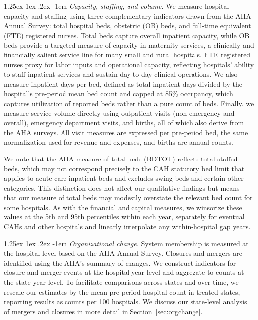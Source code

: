\documentclass[a4paper, 12pt, twoside]{article}
\makeatletter
\renewcommand\paragraph{\@startsection{paragraph}{4}{\z@}%
   {1.25ex \@plus 1ex \@minus .2ex}%
   {-1em}%
   {\normalfont\itshape}}
\makeatother
\begin{document}
\paragraph{\textit{Capacity, staffing, and volume.}}
We measure hospital capacity and staffing using three complementary indicators drawn from the AHA Annual Survey: total hospital beds, obstetric (OB) beds, and full-time equivalent (FTE) registered nurses. Total beds capture overall inpatient capacity, while OB beds provide a targeted measure of capacity in maternity services, a clinically and financially salient service line for many small and rural hospitals. FTE registered nurses proxy for labor inputs and operational capacity, reflecting hospitals' ability to staff inpatient services and sustain day-to-day clinical operations. We also measure inpatient days per bed, defined as total inpatient days divided by the hospital's pre-period mean bed count and capped at 85\% occupancy, which captures utilization of reported beds rather than a pure count of beds. Finally, we measure service volume directly using outpatient visits (non-emergency and overall), emergency department visits, and births, all of which also derive from the AHA surveys. All visit measures are expressed per pre-period bed, the same normalization used for revenue and expenses, and births are annual counts.

We note that the AHA measure of total beds (BDTOT) reflects total staffed beds, which may not correspond precisely to the CAH statutory bed limit that applies to acute care inpatient beds and excludes swing beds and certain other categories. This distinction does not affect our qualitative findings but means that our measure of total beds may modestly overstate the relevant bed count for some hospitals. As with the financial and capital measures, we winsorize these values at the 5th and 95th percentiles within each year, separately for eventual CAHs and other hospitals and linearly interpolate any within-hospital gap years.

\paragraph{\textit{Organizational change.}}  
System membership is measured at the hospital level based on the AHA Annual Survey. Closures and mergers are identified using the AHA’s summary of changes. We construct indicators for closure and merger events at the hospital-year level and aggregate to counts at the state-year level. To facilitate comparisons across states and over time, we rescale our estimates by the mean pre-period hospital count in treated states, reporting results as counts per 100 hospitals. We discuss our state-level analysis of mergers and closures in more detail in Section~\ref{sec:orgchange}. 
\end{document}
